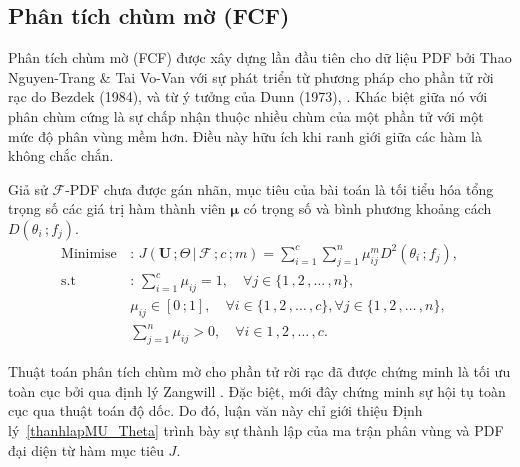 \documentclass[a4paper,oneside]{book} %
\theoremstyle{plain}
\theoremstyle{plain}
\theoremstyle{nonumberplain}
\begin{document}
\subsection{Phân tích chùm mờ (FCF)}\label{sec:FCF}

Phân tích chùm mờ (FCF) được xây dựng lần đầu tiên cho dữ liệu PDF bởi Thao Nguyen-Trang \& Tai Vo-Van \cite{nguyentrang2017fuzzy} với sự phát triển từ phương pháp cho phần tử rời rạc do Bezdek (1984), \cite{bezdek1984fcm} và từ ý tưởng của Dunn (1973), \cite{dunn1973fuzzy}. Khác biệt giữa nó với phân chùm cứng là sự chấp nhận thuộc nhiều chùm của một phần tử với một {mức độ phân vùng} mềm hơn. Điều này hữu ích khi ranh giới giữa các hàm là không chắc chắn.

Giả sử $\mathcal{F}$-PDF chưa được gán nhãn, mục tiêu của bài toán là tối tiểu hóa tổng trọng số các giá trị hàm thành viên $\bm\mu$ có trọng số và bình phương khoảng cách $D(\theta_i\,;f_j)$.
\begin{align}\tag{FCF}\label{Jf}
	\text{Minimise}\,&:\, J(\bm U\,;\Theta\,|\, \mathcal{F}\,;c\,;m) = \sum_{i=1}^{c}\sum_{j=1}^{n}\mu_{ij}^m{D}^2(\theta_i\,;{f}_j),\\\nonumber
	\text{s.t}\,&:\,\sum_{i=1}^{c} \mu_{ij} = 1,\quad \forall j \in \{1\,,2\,, \ldots\,, n\}, \tag{C1}\label{c1} \\
	\,&\mu_{ij} \in [0\,;1],\quad \forall i \in \{1\,,2\,,\ldots\,,c\}, \forall j \in \{1\,,2\,,\ldots\,,n\}, \tag{C2}\label{c2} \\
	\,&\sum_{j=1}^{n} \mu_{ij} > 0,\quad \forall i \in {1\,,2\,,\ldots\,,c}. \tag{C3}\label{c3}
\end{align}


Thuật toán phân tích chùm mờ cho phần tử rời rạc đã được chứng minh là tối ưu toàn cục bởi \cite{bezdek2013pattern, bezdek1980convergence, hathaway1988recent} qua định lý Zangwill \cite{zangwill1969nonlinear}. Đặc biệt, \cite{groll2005new} mới đây chứng minh sự hội tụ toàn cục qua thuật toán độ dốc. Do đó, luận văn này chỉ giới thiệu Định lý~\ref{thanhlapMU_Theta} trình bày sự thành lập của ma trận phân vùng và PDF đại diện từ hàm mục tiêu $J$.
\end{document}
